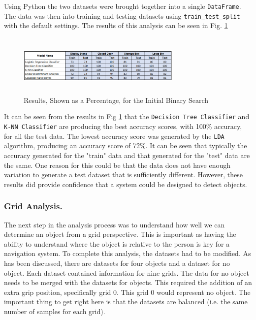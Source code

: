 \documentclass{svproc}
\begin{document}
Using Python the two datasets were brought together into a single \texttt{DataFrame}. The data was then into training and testing 
datasets using 
\texttt{train\_test\_split} with the default settings. The results of this analysis can be seen in Fig. \ref{fig:init_binary}

\begin{figure}[ht]
\includegraphics[width=8cm, height=3cm]{images/initial_binary_search.png}
\centering
\caption{Results, Shown as a Percentage, for the Initial Binary Search}
\label{fig:init_binary}
\end{figure}

It can be seen from the results in Fig \ref{fig:init_binary} that the \texttt{Decision Tree Classifier} and \texttt{K-NN Classifier} are 
producing the best accuracy scores, with 100\% accuracy, for all the test data. The lowest accuracy score was generated by the \texttt{LDA} 
algorithm, producing an accuracy score of 72\%. It can be seen that typically the accuracy generated for the "train" data and that generated 
for the "test" data are the same. One reason for this could be that the data does not have enough variation to generate a test dataset that 
is sufficiently different. However, these results did provide confidence that a system could be designed to detect objects. 

\subsubsection{Grid Analysis.}
The next step in the analysis process was to understand how well we can determine an object from a grid perspective. 
This is important as having the ability to understand where the object is relative to the person is key for a navigation system. To complete this 
analysis, the datasets had to be modified. As has been discussed, there are datasets for four objects and a dataset for no object. Each dataset 
contained information for nine grids. The data for no object needs to be merged with the datasets for objects. This required the addition of 
an extra grip position, specifically grid 0. This grid 0 would represent no object. The important thing to get right here is that the datasets 
are balanced (i.e. the same number of samples for each grid). 
\end{document}
